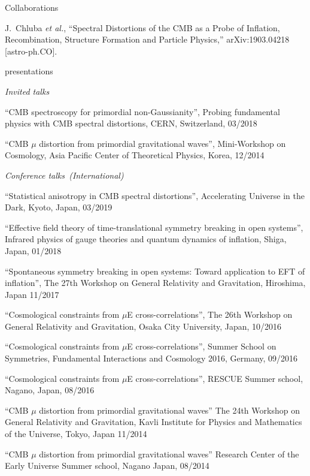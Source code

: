 \documentclass[a4paper]{resume} %
\begin{document}
\begin{rSection}{Collaborations}


\begin{etaremune}
\item%
  J.~Chluba {\it et al.},
  ``Spectral Distortions of the CMB as a Probe of Inflation, Recombination, Structure Formation and Particle Physics,''
  arXiv:1903.04218 [astro-ph.CO].
\end{etaremune}






\end{rSection}




\begin{rSection}{presentations}

\noindent\textit{Invited talks}
\begin{etaremune}
	 \item
``CMB spectroscopy for primordial non-Gaussianity'', Probing fundamental physics with CMB spectral distortions, CERN, Switzerland, 03/2018
    \item 
``CMB $\mu$ distortion from primordial gravitational waves'', Mini-Workshop on Cosmology, Asia Pacific Center of Theoretical Physics, Korea, 12/2014
\end{etaremune}

\noindent\textit{Conference talks~(International)}

\begin{etaremune}
	\item
	``Statistical anisotropy in CMB spectral distortions'', Accelerating Universe in the Dark, Kyoto, Japan, 03/2019
	\item
    ``Effective field theory of time-translational symmetry breaking in open systems'', Infrared physics of gauge theories and quantum dynamics of inflation, Shiga, Japan, 01/2018
    
    \item
    ``Spontaneous symmetry breaking in open systems: Toward application to EFT of inflation'', The 27th Workshop on General Relativity and Gravitation, Hiroshima, Japan 11/2017
    \item
    ``Cosmological constraints from $\mu$E cross-correlations'', The 26th Workshop on General Relativity and Gravitation, Osaka City University, Japan, 10/2016
    \item
    ``Cosmological constraints from $\mu$E cross-correlations'', Summer School on Symmetries, Fundamental Interactions and Cosmology 2016, Germany, 09/2016
    \item
    ``Cosmological constraints from $\mu$E cross-correlations'', RESCUE Summer school, Nagano, Japan, 08/2016
    \item
``CMB $\mu$ distortion from primordial gravitational waves'' The 24th Workshop on General Relativity and Gravitation, Kavli Institute for Physics and Mathematics of the Universe, Tokyo, Japan 11/2014     
    \item 
    ``CMB $\mu$ distortion from primordial gravitational waves'' Research Center of the Early Universe Summer school, Nagano Japan, 08/2014
    

\end{etaremune}
\end{rSection}
\end{document}
